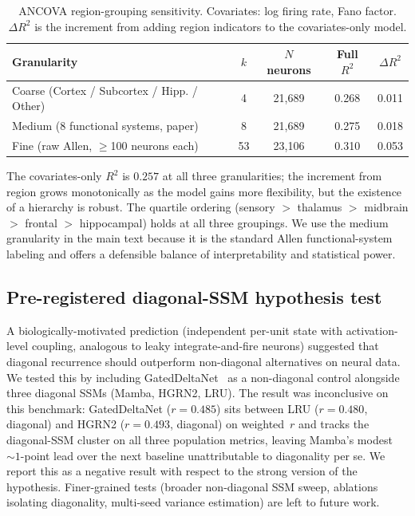 \documentclass{article}
\begin{document}
\begin{table}[h]
  \caption{ANCOVA region-grouping sensitivity.  Covariates: log firing
    rate, Fano factor.  $\Delta R^{2}$ is the increment from adding
    region indicators to the covariates-only model.}
  \label{tab:region-sensitivity}
  \centering
  \small
  \setlength{\tabcolsep}{4pt}
  \begin{tabular}{@{} l c c c c @{}}
    \toprule
    \textbf{Granularity} & \textbf{$k$} & \textbf{$N$ neurons}
      & \textbf{Full $R^{2}$} & \textbf{$\Delta R^{2}$} \\
    \midrule
    Coarse (Cortex / Subcortex / Hipp. / Other) & 4 & 21{,}689
      & 0.268 & 0.011 \\
    Medium (8 functional systems, paper) & 8 & 21{,}689
      & 0.275 & 0.018 \\
    Fine (raw Allen, $\geq$100 neurons each) & 53 & 23{,}106
      & 0.310 & 0.053 \\
    \bottomrule
  \end{tabular}
\end{table}

The covariates-only $R^{2}$ is $0.257$ at all three granularities;
the increment from region grows monotonically as the model gains more
flexibility, but the existence of a hierarchy is robust.  The
quartile ordering (sensory $>$ thalamus $>$ midbrain $>$ frontal $>$
hippocampal) holds at all three groupings.  We use the medium
granularity in the main text because it is the standard Allen
functional-system labeling and offers a defensible balance of
interpretability and statistical power.

\subsection{Pre-registered diagonal-SSM hypothesis test}
\label{app:diagonal-ssm}

A biologically-motivated prediction (independent per-unit state with
activation-level coupling, analogous to leaky integrate-and-fire
neurons) suggested that diagonal recurrence should outperform
non-diagonal alternatives on neural data.  We tested this by including
GatedDeltaNet~\citep{yang2024gateddelta} as a non-diagonal control
alongside three diagonal SSMs (Mamba, HGRN2, LRU).  The result was
inconclusive on this benchmark: GatedDeltaNet ($r{=}0.485$) sits
between LRU ($r{=}0.480$, diagonal) and HGRN2 ($r{=}0.493$,
diagonal) on weighted~$r$ and tracks the diagonal-SSM cluster on all
three population metrics, leaving Mamba's modest ${\sim}1$-point lead
over the next baseline unattributable to diagonality per se.  We
report this as a negative result with respect to the strong version of
the hypothesis.  Finer-grained tests (broader non-diagonal SSM sweep,
ablations isolating diagonality, multi-seed variance estimation) are
left to future work.
\end{document}
